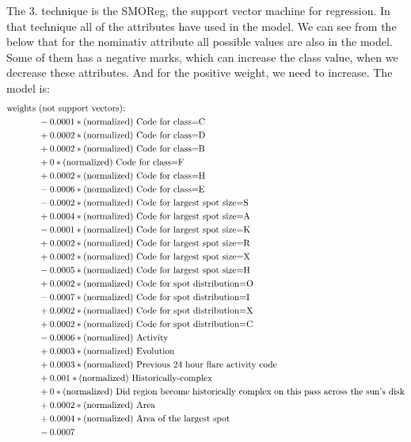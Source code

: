 \documentclass[a4paper]{article}
\begin{document}
The 3. technique is the SMOReg, the support vector machine for regression. In that technique all of the attributes have used in the model. We can see from the below that for the nominativ attribute all possible values are also in the model. Some of them has a negative marks, which can increase the class value, when we decrease these attributes. And for the positive weight, we need to increase. The model is:
\begin{align*}
\textnormal{weights }& \textnormal{(not support vectors):}\\
& -       0.0001 * \textnormal{(normalized) Code for class=C}\\
& +       0.0002 * \textnormal{(normalized) Code for class=D}\\
& +       0.0002 * \textnormal{(normalized) Code for class=B}\\
& +       0      * \textnormal{(normalized) Code for class=F}\\
& +       0.0002 * \textnormal{(normalized) Code for class=H}\\
& -       0.0006 * \textnormal{(normalized) Code for class=E}\\
& -       0.0002 * \textnormal{(normalized) Code for largest spot size=S}\\
& +       0.0004 * \textnormal{(normalized) Code for largest spot size=A}\\
& -       0.0001 * \textnormal{(normalized) Code for largest spot size=K}\\
& +       0.0002 * \textnormal{(normalized) Code for largest spot size=R}\\
& +       0.0002 * \textnormal{(normalized) Code for largest spot size=X}\\
& -       0.0005 * \textnormal{(normalized) Code for largest spot size=H}\\
& +       0.0002 * \textnormal{(normalized) Code for spot distribution=O}\\
& -       0.0007 * \textnormal{(normalized) Code for spot distribution=I}\\
& +       0.0002 * \textnormal{(normalized) Code for spot distribution=X}\\
& +       0.0002 * \textnormal{(normalized) Code for spot distribution=C}\\
& -       0.0006 * \textnormal{(normalized) Activity}\\
& +       0.0003 * \textnormal{(normalized) Evolution}\\
& +       0.0003 * \textnormal{(normalized) Previous 24 hour flare activity code}\\
& +       0.001  * \textnormal{(normalized) Historically-complex}\\
& +       0      * \textnormal{(normalized) Did region become historically complex on this pass across the sun's disk}\\
& +       0.0002 * \textnormal{(normalized) Area}\\
& +       0.0004 * \textnormal{(normalized) Area of the largest spot}\\
& -       0.0007\\
\end{align*}
\end{document}
